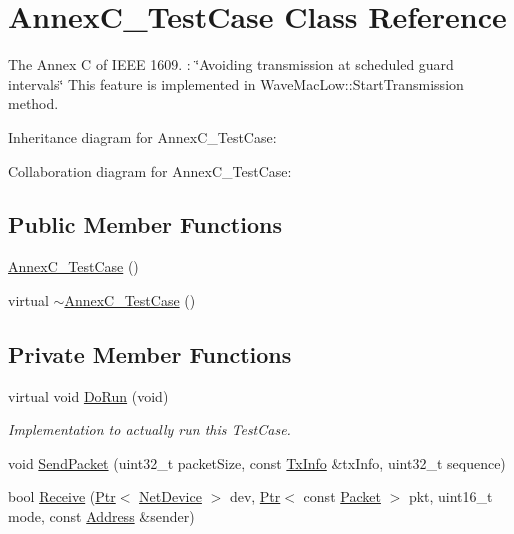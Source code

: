 \hypertarget{classAnnexC__TestCase}{}\section{Annex\+C\+\_\+\+Test\+Case Class Reference}
\label{classAnnexC__TestCase}


The Annex C of I\+E\+EE 1609. \+: \char`\"{}\+Avoiding transmission at scheduled guard intervals\char`\"{} This feature is implemented in Wave\+Mac\+Low\+::\+Start\+Transmission method.  




Inheritance diagram for Annex\+C\+\_\+\+Test\+Case\+:


Collaboration diagram for Annex\+C\+\_\+\+Test\+Case\+:
\subsection*{Public Member Functions}
\begin{DoxyCompactItemize}
\item 
\hyperlink{classAnnexC__TestCase_acbebe1e1efd1c9a70d776f5491f790cd}{Annex\+C\+\_\+\+Test\+Case} ()
\item 
virtual \hyperlink{classAnnexC__TestCase_a9c4a76c1246821cf748a17889df6d188}{$\sim$\+Annex\+C\+\_\+\+Test\+Case} ()
\end{DoxyCompactItemize}
\subsection*{Private Member Functions}
\begin{DoxyCompactItemize}
\item 
virtual void \hyperlink{classAnnexC__TestCase_a7b68ef07f88bcfece999dafba55020fa}{Do\+Run} (void)
\begin{DoxyCompactList}\small\item\em Implementation to actually run this Test\+Case. \end{DoxyCompactList}\item 
void \hyperlink{classAnnexC__TestCase_a6ad361d48194ad49b3856a12db4d4ea7}{Send\+Packet} (uint32\+\_\+t packet\+Size, const \hyperlink{structns3_1_1TxInfo}{Tx\+Info} \&tx\+Info, uint32\+\_\+t sequence)
\item 
bool \hyperlink{classAnnexC__TestCase_a0d034868a04a1e7e7a6fb4c43f34b9db}{Receive} (\hyperlink{classns3_1_1Ptr}{Ptr}$<$ \hyperlink{classns3_1_1NetDevice}{Net\+Device} $>$ dev, \hyperlink{classns3_1_1Ptr}{Ptr}$<$ const \hyperlink{classns3_1_1Packet}{Packet} $>$ pkt, uint16\+\_\+t mode, const \hyperlink{classns3_1_1Address}{Address} \&sender)
\end{DoxyCompactItemize}
